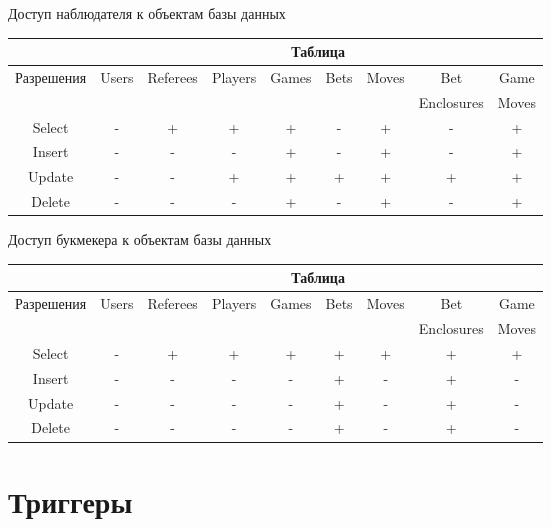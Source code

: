 \begin{center}
	\begin{threeparttable}
		\captionsetup{justification=raggedright,singlelinecheck=off}
		\caption{\label{spectator_privileges}Доступ наблюдателя к объектам базы данных}
		\centering
		\begin{tabular}{|c|c|c|c|c|c|c|c|c|}
			\hline
			& \multicolumn{8}{|c|}{Таблица} \\
			\hline
			Разрешения & Users & Referees & Players & Games & Bets & Moves & Bet & Game \\
			&&&&&&& Enclosures & Moves \\
			\hline
			Select & - & + & + & + & - & + & - & + \\
			\hline
			Insert & - & - & - & + & - & + & - & + \\
			\hline
			Update & - & - & + & + & + & + & + & + \\
			\hline
			Delete & - & - & - & + & - & + & - & + \\
			\hline
		\end{tabular}
	\end{threeparttable}
\end{center}
\begin{center}
	\begin{threeparttable}
		\captionsetup{justification=raggedright,singlelinecheck=off}
		\caption{\label{bookmaker_privileges}Доступ букмекера к объектам базы данных}
		\centering
		\begin{tabular}{|c|c|c|c|c|c|c|c|c|}
			\hline
			& \multicolumn{8}{|c|}{Таблица} \\
			\hline
			Разрешения & Users & Referees & Players & Games & Bets & Moves & Bet & Game \\
			&&&&&&& Enclosures & Moves \\
			\hline
			Select & - & + & + & + & + & + & + & + \\
			\hline
			Insert & - & - & - & - & + & - & + & - \\
			\hline
			Update & - & - & - & - & + & - & + & - \\
			\hline
			Delete & - & - & - & - & + & - & + & - \\
			\hline
		\end{tabular}
	\end{threeparttable}
\end{center}

\section{Триггеры}

